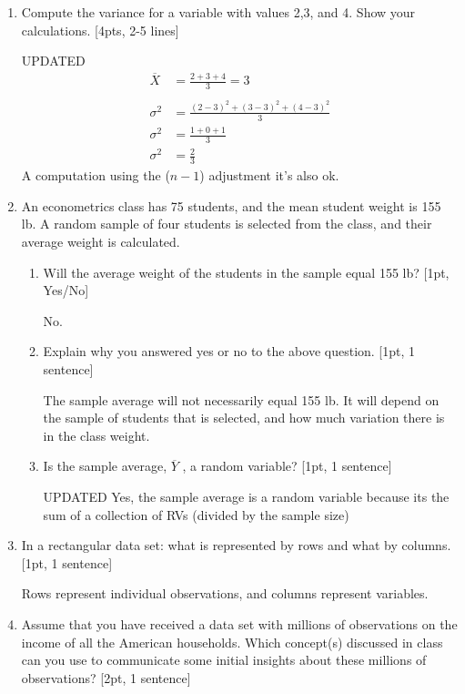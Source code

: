 \documentclass[answers]{exam}
\begin{document}
\begin{enumerate}
	\item Compute the variance for a variable with values 2,3, and 4. Show your calculations. [4pts, 2-5 lines] 
	\begin{solution}
UPDATED
	\begin{align*}
	    \overline{X} & = \frac{2+3+4}{3} = 3 \\
	    & \\
	    \sigma^2 & = \frac{(2-3)^2 + (3-3)^2 + (4-3)^2}{3} \\ 
	    \sigma^2 & = \frac{1 + 0 + 1}{3} \\ 
	    \sigma^2 & = \frac{2}{3}
	\end{align*}
A computation using the ($n-1$) adjustment it's also ok. 
	\end{solution}

	
\newpage
	\item An econometrics class has 75 students, and the mean student weight is 155 lb. A random sample of four students is selected from the class, and their average weight is calculated. 
	\begin{enumerate}
	    \item Will the average weight of the students in the sample equal 155 lb? [1pt, Yes/No] 
\begin{solution}
No.
\end{solution}

    \item Explain why you answered yes or no to the above question. [1pt, 1 sentence] \begin{solution}
	    The sample average will not necessarily equal 155 lb. It will depend on the sample of students that is selected, and how much variation there is in the class weight.
	    \end{solution}
	    \item Is the sample average, $\overline{Y}$ , a random variable? [1pt, 1 sentence] 
	    \begin{solution}
	    UPDATED Yes, the sample average is a random variable because its the sum of a collection of RVs (divided by the sample size)
	    \end{solution}
	\end{enumerate}


	\item In a rectangular data set: what is represented by rows and what by columns.  [1pt, 1 sentence]

\begin{solution}
    Rows represent individual observations, and columns represent variables. 
\end{solution}
	\item Assume that you have received a data set with millions of observations on the income of all the American households. Which concept(s) discussed in class can you use to communicate some initial insights about these millions of observations? [2pt, 1 sentence]


\end{enumerate}
\end{document}

